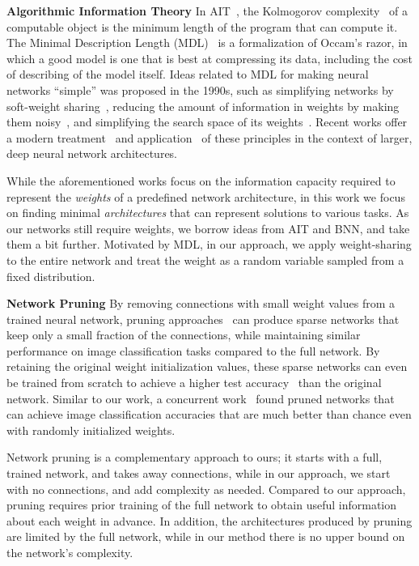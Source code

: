 \textbf{Algorithmic Information Theory}\: In AIT~\cite{solomonoff1964formal}, the Kolmogorov complexity~\cite{kolmogorov1965three} of a computable object is the minimum length of the program that can compute it. The Minimal Description Length (MDL)~\cite{rissanen1978modeling,grunwald2007minimum,rissanen2007information} is a formalization of Occam's razor, in which a good model is one that is best at compressing its data, including the cost of describing of the model itself. Ideas related to MDL for making neural networks “simple” was proposed in the 1990s, such as simplifying networks by soft-weight sharing~\cite{nowlan1992simplifying}, reducing the amount of information in weights by making them noisy~\cite{hinton1993keeping}, and simplifying the search space of its weights~\cite{schmidhuber1997discovering}. Recent works offer a modern treatment~\cite{blier2018description} and application~\cite{li2018measuring,trask2018neural} of these principles in the context of larger, deep neural network architectures.

While the aforementioned works focus on the information capacity required to represent the \textit{weights} of a predefined network architecture, in this work we focus on finding minimal \textit{architectures} that can represent solutions to various tasks. As our networks still require weights, we borrow ideas from AIT and BNN, and take them a bit further. Motivated by MDL, in our approach, we apply weight-sharing to the entire network and treat the weight as a random variable sampled from a fixed distribution.

\textbf{Network Pruning}\; By removing connections with small weight values from a trained neural network, pruning approaches~\cite{lecun1990optimal,hassibi1993second,han2015learning,guo2016dynamic,li2016pruning,molchanov2016pruning,luo2017thinet,liu2018rethinking,mallya2018piggyback} can produce sparse networks that keep only a small fraction of the connections, while maintaining similar performance on image classification tasks compared to the full network. By retaining the original weight initialization values, these sparse networks can even be trained from scratch to achieve a higher test accuracy~\cite{frankle2018lottery,lee2018snip} than the original network. Similar to our work, a concurrent work~\cite{zhou2019deconstructing} found pruned networks that can achieve image classification accuracies that are much better than chance even with randomly initialized weights.

Network pruning is a complementary approach to ours; it starts with a full, trained network, and takes away connections, while in our approach, we start with no connections, and add complexity as needed. Compared to our approach, pruning requires prior training of the full network to obtain useful information about each weight in advance. In addition, the architectures produced by pruning are limited by the full network, while in our method there is no upper bound on the network's complexity.

